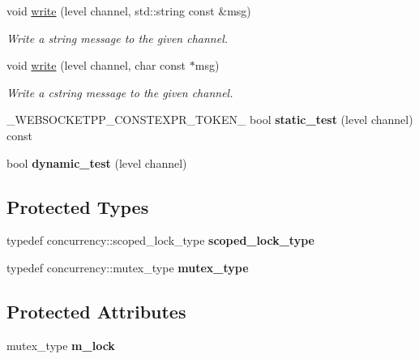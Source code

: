 \begin{DoxyCompactItemize}
\item 
void \hyperlink{classwebsocketpp_1_1log_1_1basic_a9f87a8c3e5d8e25e5f014756827a587a}{write} (level channel, std\+::string const \&msg)
\begin{DoxyCompactList}\small\item\em Write a string message to the given channel. \end{DoxyCompactList}\item 
void \hyperlink{classwebsocketpp_1_1log_1_1basic_a693e6a522f654fd131a0c6f8d084c921}{write} (level channel, char const $\ast$msg)
\begin{DoxyCompactList}\small\item\em Write a cstring message to the given channel. \end{DoxyCompactList}\item 
\+\_\+\+W\+E\+B\+S\+O\+C\+K\+E\+T\+P\+P\+\_\+\+C\+O\+N\+S\+T\+E\+X\+P\+R\+\_\+\+T\+O\+K\+E\+N\+\_\+ bool {\bfseries static\+\_\+test} (level channel) const\hypertarget{classwebsocketpp_1_1log_1_1basic_a735d9aa5c0776140c092bc3e5d58341d}{}\label{classwebsocketpp_1_1log_1_1basic_a735d9aa5c0776140c092bc3e5d58341d}

\item 
bool {\bfseries dynamic\+\_\+test} (level channel)\hypertarget{classwebsocketpp_1_1log_1_1basic_a8f443b4ff286da803a114897a8f97105}{}\label{classwebsocketpp_1_1log_1_1basic_a8f443b4ff286da803a114897a8f97105}

\end{DoxyCompactItemize}
\subsection*{Protected Types}
\begin{DoxyCompactItemize}
\item 
typedef concurrency\+::scoped\+\_\+lock\+\_\+type {\bfseries scoped\+\_\+lock\+\_\+type}\hypertarget{classwebsocketpp_1_1log_1_1basic_aa11847dfc30ac1f1c9c5fc599132560f}{}\label{classwebsocketpp_1_1log_1_1basic_aa11847dfc30ac1f1c9c5fc599132560f}

\item 
typedef concurrency\+::mutex\+\_\+type {\bfseries mutex\+\_\+type}\hypertarget{classwebsocketpp_1_1log_1_1basic_a293124c7129b2c70c8ed33d355d3b355}{}\label{classwebsocketpp_1_1log_1_1basic_a293124c7129b2c70c8ed33d355d3b355}

\end{DoxyCompactItemize}
\subsection*{Protected Attributes}
\begin{DoxyCompactItemize}
\item 
mutex\+\_\+type {\bfseries m\+\_\+lock}\hypertarget{classwebsocketpp_1_1log_1_1basic_ad837b993a6e1070fbd3c1dc59b15a0eb}{}\label{classwebsocketpp_1_1log_1_1basic_ad837b993a6e1070fbd3c1dc59b15a0eb}

\end{DoxyCompactItemize}


